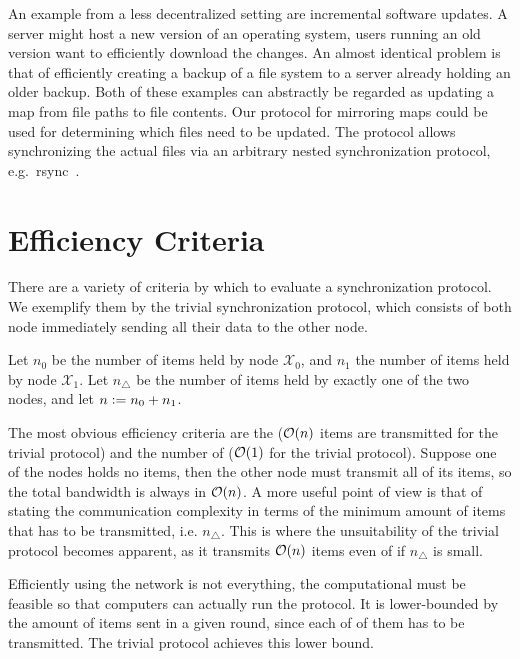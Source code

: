 An example from a less decentralized setting are incremental software
updates. A server might host a new version of an operating system, users
running an old version want to efficiently download the changes. An
almost identical problem is that of efficiently creating a backup of a file
system to a server already holding an older backup. Both of these
examples can abstractly be regarded as updating a map from file paths to
file contents. Our protocol for mirroring maps could be used for
determining which files need to be updated. The protocol allows
synchronizing the actual files via an arbitrary nested synchronization
protocol, e.g.~rsync~\cite{tridgell1996rsync}.

\section{Efficiency Criteria}\label{efficiency-criteria}

There are a variety of criteria by which to evaluate a synchronization
protocol. We exemplify them by the trivial synchronization protocol,
which consists of both node immediately sending all their data to the
other node.

Let $n_0$ be the number of items held by node $\mathcal{X}_0$, and $n_1$ the number of items
held by node $\mathcal{X}_1$. Let $n_{\triangle}$ be the number of items held by exactly one of the two nodes, and let $n \vcentcolon= n_0 + n_1$.

The most obvious efficiency criteria are the 
($\mathcal{O}(n)$ items are transmitted for the trivial protocol) and the number of
 ($\mathcal{O}(1)$ for the trivial protocol). Suppose one of the nodes holds no items, then the other node must transmit all of its items, so the total bandwidth is always in $\mathcal{O}(n)$. A more useful point of view is that of stating the communication complexity in terms of the minimum amount of items that has to be transmitted, i.e. $n_{\triangle}$. This is where the unsuitability of the trivial protocol becomes apparent, as it transmits $\mathcal{O}(n)$ items even of if $n_{\triangle}$ is small.

Efficiently using the network is not everything, the computational
 must be feasible so that
computers can actually run the protocol. It is lower-bounded by the
amount of items sent in a given round, since each of of them has to be transmitted. The trivial protocol achieves this lower bound.


